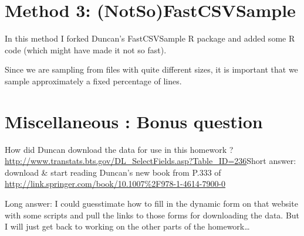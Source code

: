 \documentclass[letterpaper,10pt,english]{/usr/local/lib/python2.7/dist-packages/sphinx/texinputs/sphinxhowto}
\begin{document}
        
    
\section{Method 3: (NotSo)FastCSVSample}In this method I forked Duncan's FastCSVSample R package and added some
R code (which might have made it not so fast).

Since we are sampling from files with quite different sizes, it is
important that we sample approximately a fixed percentage of lines.\section{Miscellaneous : Bonus question}How did Duncan download the data for use in this homework ?
\url{http://www.transtats.bts.gov/DL_SelectFields.asp?Table_ID=236}Short answer: download \& start reading Duncan's new book from P.333 of
\url{http://link.springer.com/book/10.1007\%2F978-1-4614-7900-0}

Long answer: I could guesstimate how to fill in the dynamic form on that
website with some scripts and pull the links to those forms for
downloading the data. But I will just get back to working on the other
parts of the homework\ldots{}
        

        \renewcommand{\indexname}{Index}
        \printindex

    
\end{document}
